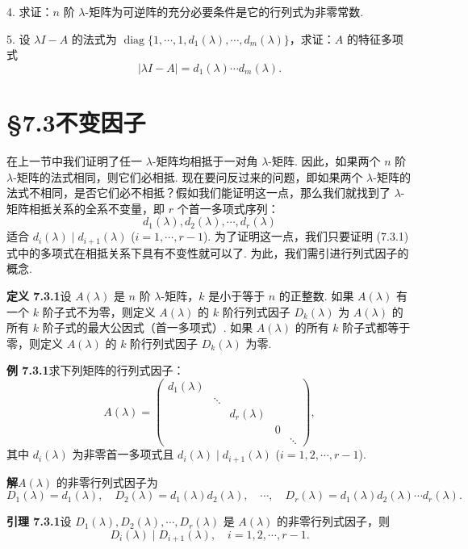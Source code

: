 \documentclass[UTF8,12pt,a4paper,fontset=fandol]{ctexart}
\begin{document}
4. 求证：$n$ 阶 $\lambda$-矩阵为可逆阵的充分必要条件是它的行列式为非零常数.

5. 设 $\lambda I-A$ 的法式为 $\operatorname{diag}\{1,\cdots,1,d_1(\lambda),\cdots,d_m(\lambda)\}$，求证：$A$ 的特征多项式
\[
|\lambda I-A|=d_1(\lambda)\cdots d_m(\lambda).
\]

\section*{§7.3\quad 不变因子}

在上一节中我们证明了任一 $\lambda$-矩阵均相抵于一对角 $\lambda$-矩阵. 因此，如果两个 $n$ 阶 $\lambda$-矩阵的法式相同，则它们必相抵. 现在要问反过来的问题，即如果两个 $\lambda$-矩阵的法式不相同，是否它们必不相抵？假如我们能证明这一点，那么我们就找到了 $\lambda$-矩阵相抵关系的全系不变量，即 $r$ 个首一多项式序列：
\begin{equation}
d_1(\lambda),d_2(\lambda),\cdots,d_r(\lambda)
\tag{7.3.1}
\end{equation}
适合 $d_i(\lambda)\mid d_{i+1}(\lambda)$ ($i=1,\cdots,r-1$). 为了证明这一点，我们只要证明 (7.3.1) 式中的多项式在相抵关系下具有不变性就可以了. 为此，我们需引进行列式因子的概念.

\noindent\textbf{定义 7.3.1}\quad 设 $A(\lambda)$ 是 $n$ 阶 $\lambda$-矩阵，$k$ 是小于等于 $n$ 的正整数. 如果 $A(\lambda)$ 有一个 $k$ 阶子式不为零，则定义 $A(\lambda)$ 的 $k$ 阶行列式因子 $D_k(\lambda)$ 为 $A(\lambda)$ 的所有 $k$ 阶子式的最大公因式（首一多项式）. 如果 $A(\lambda)$ 的所有 $k$ 阶子式都等于零，则定义 $A(\lambda)$ 的 $k$ 阶行列式因子 $D_k(\lambda)$ 为零.

\noindent\textbf{例 7.3.1}\quad 求下列矩阵的行列式因子：
\[
A(\lambda)=
\left(\begin{array}{ccccc}
d_1(\lambda) & & & & \\
& \ddots & & & \\
& & d_r(\lambda) & & \\
& & & 0 & \\
& & & & \ddots
\end{array}\right),
\]
其中 $d_i(\lambda)$ 为非零首一多项式且 $d_i(\lambda)\mid d_{i+1}(\lambda)$ ($i=1,2,\cdots,r-1$).

\noindent\textbf{解}\quad $A(\lambda)$ 的非零行列式因子为
\[
D_1(\lambda)=d_1(\lambda),\quad D_2(\lambda)=d_1(\lambda)d_2(\lambda),\quad \cdots,\quad D_r(\lambda)=d_1(\lambda)d_2(\lambda)\cdots d_r(\lambda).
\]

\noindent\textbf{引理 7.3.1}\quad 设 $D_1(\lambda),D_2(\lambda),\cdots,D_r(\lambda)$ 是 $A(\lambda)$ 的非零行列式因子，则
\[
D_i(\lambda)\mid D_{i+1}(\lambda),\quad i=1,2,\cdots,r-1.
\]
\end{document}
